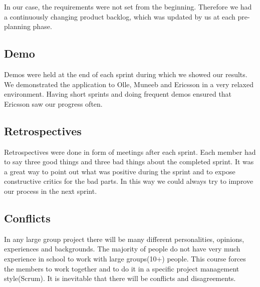 In our case, the requirements were not set from the beginning. Therefore we had a continuously
changing product backlog, which was updated by us at each pre-planning phase.

\subsection{Demo}
Demos were held at the end of each sprint during which we showed our results.
We demonstrated the application to Olle, Muneeb and Ericsson in a very relaxed environment. Having short sprints and doing frequent
demos ensured that Ericsson saw our progress often.

\subsection{Retrospectives}
Retrospectives were done in form of meetings after each sprint. Each member had to say three good things and three bad things about
the completed sprint. It was a great way to point out what was positive during the sprint
and to expose constructive critics for the bad parts. In this way we could always try to improve our process in the next sprint.

\subsection{Conflicts}
In any large group project there will be many different personalities, opinions, experiences and backgrounds. The majority of people do not have very much experience in school to work with large groups(10+) people. This course forces the members to work together and to do it in a specific project management style(Scrum). It is inevitable that there will be conflicts and disagreements. 

